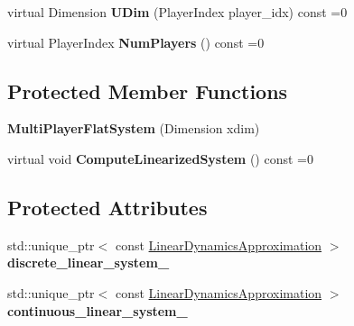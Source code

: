 \begin{DoxyCompactItemize}
\item 
virtual Dimension {\bfseries U\+Dim} (Player\+Index player\+\_\+idx) const =0\hypertarget{classilqgames_1_1_multi_player_flat_system_a1cb3a0636263a35dd2b10f8b203bf29b}{}\label{classilqgames_1_1_multi_player_flat_system_a1cb3a0636263a35dd2b10f8b203bf29b}

\item 
virtual Player\+Index {\bfseries Num\+Players} () const =0\hypertarget{classilqgames_1_1_multi_player_flat_system_a5732cac3a3a64567a3d1b460d787a52d}{}\label{classilqgames_1_1_multi_player_flat_system_a5732cac3a3a64567a3d1b460d787a52d}

\end{DoxyCompactItemize}
\subsection*{Protected Member Functions}
\begin{DoxyCompactItemize}
\item 
{\bfseries Multi\+Player\+Flat\+System} (Dimension xdim)\hypertarget{classilqgames_1_1_multi_player_flat_system_a9e34ca342aa1d99326fe144166324777}{}\label{classilqgames_1_1_multi_player_flat_system_a9e34ca342aa1d99326fe144166324777}

\item 
virtual void {\bfseries Compute\+Linearized\+System} () const =0\hypertarget{classilqgames_1_1_multi_player_flat_system_ab5e1b8bb3cf07f07c04d7f3884c1c015}{}\label{classilqgames_1_1_multi_player_flat_system_ab5e1b8bb3cf07f07c04d7f3884c1c015}

\end{DoxyCompactItemize}
\subsection*{Protected Attributes}
\begin{DoxyCompactItemize}
\item 
std\+::unique\+\_\+ptr$<$ const \hyperlink{structilqgames_1_1_linear_dynamics_approximation}{Linear\+Dynamics\+Approximation} $>$ {\bfseries discrete\+\_\+linear\+\_\+system\+\_\+}\hypertarget{classilqgames_1_1_multi_player_flat_system_a70c6bbb2e4cd3653594fd650fbcdad94}{}\label{classilqgames_1_1_multi_player_flat_system_a70c6bbb2e4cd3653594fd650fbcdad94}

\item 
std\+::unique\+\_\+ptr$<$ const \hyperlink{structilqgames_1_1_linear_dynamics_approximation}{Linear\+Dynamics\+Approximation} $>$ {\bfseries continuous\+\_\+linear\+\_\+system\+\_\+}\hypertarget{classilqgames_1_1_multi_player_flat_system_ab4961edf0a14f8645c79d2ad39ebd7d6}{}\label{classilqgames_1_1_multi_player_flat_system_ab4961edf0a14f8645c79d2ad39ebd7d6}

\end{DoxyCompactItemize}

